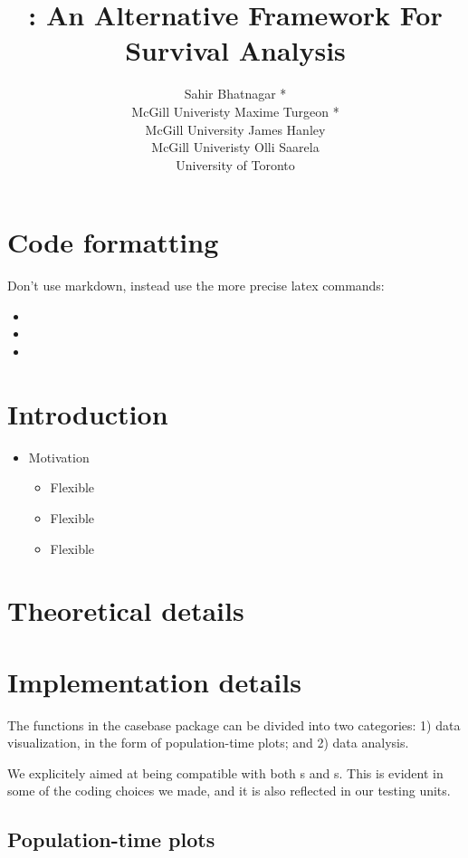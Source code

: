 \documentclass[article]{jss}
\author{
Sahir Bhatnagar *\\McGill Univeristy \And Maxime Turgeon *\\McGill University \And James Hanley\\McGill Univeristy \And Olli Saarela\\University of Toronto
}
\title{\pkg{casebase}: An Alternative Framework For Survival Analysis}
\providecommand{\tightlist}{%
  \setlength{\itemsep}{0pt}\setlength{\parskip}{0pt}}
\begin{document}
\section{Code formatting}\label{code-formatting}

Don't use markdown, instead use the more precise latex commands:

\begin{itemize}
\tightlist
\item
\item
\item
\end{itemize}

\section{Introduction}\label{introduction}

\begin{itemize}
\tightlist
\item
  Motivation

  \begin{itemize}
  \tightlist
  \item
    Flexible
  \item
    Flexible
  \item
    Flexible
  \end{itemize}
\end{itemize}

\section{Theoretical details}\label{theoretical-details}

\section{Implementation details}\label{implementation-details}

The functions in the casebase package can be divided into two
categories: 1) data visualization, in the form of population-time plots;
and 2) data analysis.

We explicitely aimed at being compatible with both s
and s. This is evident in some of the coding choices we
made, and it is also reflected in our testing units.

\subsection{Population-time plots}\label{population-time-plots}
\end{document}
